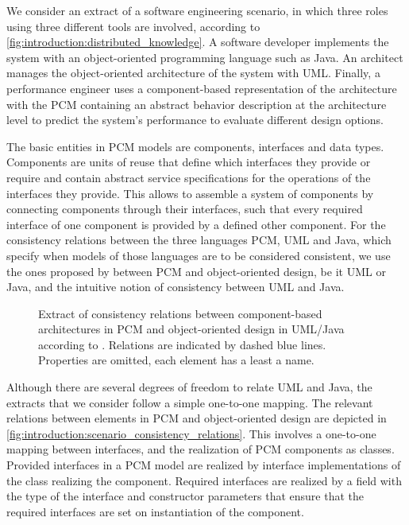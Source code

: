 We consider an extract of a software engineering scenario, in which three roles using three different tools are involved, according to \autoref{fig:introduction:distributed_knowledge}. 
A software developer implements the system with an object-oriented programming language such as Java.
An architect manages the object-oriented architecture of the system with \gls{UML}. 
Finally, a performance engineer uses a component-based representation of the architecture with the \gls{PCM} containing an abstract behavior description at the architecture level to predict the system's performance to evaluate different design options.

The basic entities in \gls{PCM} models are components, interfaces and data types.
Components are units of reuse that define which interfaces they provide or require and contain abstract service specifications for the operations of the interfaces they provide.
This allows to assemble a system of components by connecting components through their interfaces, such that every required interface of one component is provided by a defined other component.
For the consistency relations between the three languages \gls{PCM}, \gls{UML} and Java, which specify when models of those languages are to be considered consistent, we use the ones proposed by \textcite{langhammer2017a} between \gls{PCM} and object-oriented design, be it \gls{UML} or Java, and the intuitive notion of consistency between \gls{UML} and Java.

\begin{figure}
    \centering
    
    \caption[Consistency relations for PCM and UML/Java]{Extract of consistency relations between component-based architectures in \gls{PCM} and object-oriented design in \gls{UML}/Java according to \cite{langhammer2017a}. Relations are indicated by dashed blue lines. Properties are omitted, each element has a least a name.}
    \label{fig:introduction:scenario_consistency_relations}
\end{figure}

Although there are several degrees of freedom to relate \gls{UML} and Java, the extracts that we consider follow a simple one-to-one mapping.
The relevant relations between elements in \gls{PCM} and object-oriented design are depicted in \autoref{fig:introduction:scenario_consistency_relations}.
This involves a one-to-one mapping between interfaces, and the realization of \gls{PCM} components as classes. 
Provided interfaces in a \gls{PCM} model are realized by interface implementations of the class realizing the component. 
Required interfaces are realized by a field with the type of the interface and constructor parameters that ensure that the required interfaces are set on instantiation of the component.

